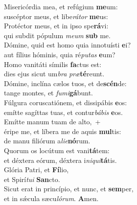 \evenverse Misericórdia mea, et refúgium \textbf{me}um:~\*\\
\evenverse suscéptor meus, et libe\textit{rá}\textit{tor} \textbf{me}us:\\
\oddverse Protéctor meus, et in ipso spe\textbf{rá}vi:~\*\\
\oddverse qui subdit pópulum \textit{me}\textit{um} \textbf{sub} me.\\
\evenverse Dómine, quid est homo quia innotuísti \textbf{e}i?~\*\\
\evenverse aut fílius hóminis, quia ré\textit{pu}\textit{tas} \textbf{e}um?\\
\oddverse Homo vanitáti símilis \textbf{fa}ctus est:~\*\\
\oddverse dies ejus sicut um\textit{bra} \textit{præ}\textbf{té}reunt.\\
\evenverse Dómine, inclína cælos tuos, et de\textbf{scén}de:~\*\\
\evenverse tange montes, et \textit{fu}\textit{mi}\textbf{gá}bunt.\\
\oddverse Fúlgura coruscatiónem, et dissipábis \textbf{e}os:~\*\\
\oddverse emítte sagíttas tuas, et contur\textit{bá}\textit{bis} \textbf{e}os.\\
\evenverse Emítte manum tuam de alto,~+\\
\evenverse  éripe me, et líbera me de aquis \textbf{mul}tis:~\*\\
\evenverse de manu filiórum a\textit{li}\textit{e}\textbf{nó}rum.\\
\oddverse Quorum os locútum est vani\textbf{tá}tem:~\*\\
\oddverse et déxtera eórum, déxtera i\textit{ni}\textit{qui}\textbf{tá}tis.\\
\evenverse Glória Patri, et \textbf{Fí}lio,~\*\\
\evenverse et Spirí\textit{tu}\textit{i} \textbf{San}cto.\\
\oddverse Sicut erat in princípio, et nunc, et \textbf{sem}per,~\*\\
\oddverse et in sǽcula sæcu\textit{ló}\textit{rum}. \textbf{A}men.\\
